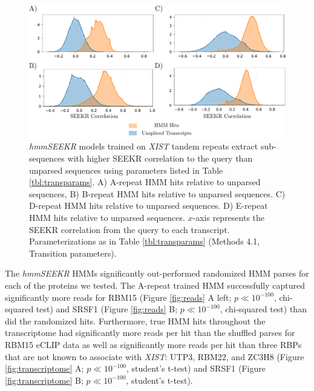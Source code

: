\begin{figure}[h!]
\centering
\includegraphics[width=.9\textwidth]{images/hmmdist.pdf}
\caption[\emph{hmmSEEKR} extracts sub-sequences with high correlation to query]{\emph{hmmSEEKR} models trained on \emph{XIST} tandem repeats extract sub-sequences with higher SEEKR correlation to the query than unparsed sequences using parameters listed in Table \ref{tbl:transparams}. A) A-repeat HMM hits relative to unparsed sequences, B) B-repeat HMM hits relative to unparsed sequences. C) D-repeat HMM hits relative to unparsed sequences. D) E-repeat HMM hits relative to unparsed sequences. $x$-axis represents the SEEKR correlation from the query to each transcript. Parameterizations as in Table \ref{tbl:transparams} (Methods 4.1, Transition parameters).}
\label{fig:hmmdist}
\end{figure}

The \emph{hmmSEEKR} HMMs significantly out-performed randomized HMM parses for each of the proteins we tested. The A-repeat trained HMM successfully captured significantly more reads for RBM15 (Figure \ref{fig:reads} A left; $p\ll 10^{-100}$, chi-squared test) and SRSF1 (Figure \ref{fig:reads} B; $p\ll 10^{-100}$, chi-squared test) than did the randomized hits. Furthermore, true HMM hits throughout the transcriptome had significantly more reads per hit than the shuffled parses for RBM15 eCLIP data as well as significantly more reads per hit than three RBPs that are not known to associate with \textit{XIST}: UTP3, RBM22, and ZC3H8 (Figure \ref{fig:transcriptome} A; $p\ll10^{-100}$, student's t-test) and SRSF1 (Figure \ref{fig:transcriptome} B; $p\ll10^{-100}$, student's t-test).

